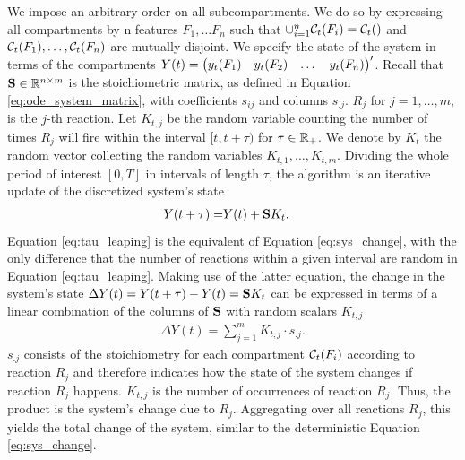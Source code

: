 
We impose an arbitrary order on all subcompartments. We do so by expressing all compartments by n features $F_1, \dots F_n$ such that $\cup_{i=1}^n \mathcal{C}_t(F_i) = \mathcal{C}_t()$ and $\mathcal{C}_t(F_1), \dots, \mathcal{C}_t(F_n)$ are mutually disjoint. We specify the state of the system in terms of the compartments $Y(t) = \begin{pmatrix} y_t(F_1) & y_t(F_2) & \dots & y_t(F_n)\end{pmatrix}'$. Recall that $\mathbf{S} \in \mathbb{R}^{n \times m}$ is the stoichiometric matrix, as defined in Equation \eqref{eq:ode_system_matrix}, with coefficients $s_{ij}$ and columns $s_{.j}$. $R_j$ for $j=1, \dots, m$, is the $j$-th reaction. Let $K_{t,j}$ be the random variable counting the number of times $R_j$ will fire within the interval $[t, t + \tau)$ for $\tau \in \mathbb{R}_+$. We denote by $K_t$ the random vector collecting the random variables $K_{t,1}, \hdots, K_{t,m}$. Dividing the whole period of interest $[0, T]$ in intervals of length $\tau$, the algorithm is an iterative update of the discretized system's state
\begin{align}
\label{eq:tau_leaping}
Y(t + \tau) =& Y(t) + \mathbf{S} K_t.
\end{align}
Equation \eqref{eq:tau_leaping} is the equivalent of Equation \eqref{eq:sys_change}, with the only difference that the number of reactions within a given interval are random in Equation \eqref{eq:tau_leaping}. Making use of the latter equation, the change in the system's state $\Delta Y(t) = Y(t + \tau) - Y(t)= \mathbf{S} K_t$ can be expressed in terms of a linear combination of the columns of $\mathbf{S}$ with random scalars $K_{t,j}$
\begin{align}
\Delta Y(t) = \sum_{j=1}^m K_{t,j} \cdot s_{.j}.
\end{align}
$s_{.j}$ consists of the stoichiometry for each compartment $\mathcal{C}_t(F_i)$ according to reaction $R_j$ and therefore indicates how the state of the system changes if reaction $R_j$ happens. $K_{t,j}$ is the number of occurrences of reaction $R_j$. Thus, the product is the system's change due to $R_j$. Aggregating over all reactions $R_j$, this yields the total change of the system, similar to the deterministic Equation \eqref{eq:sys_change}.\\  

